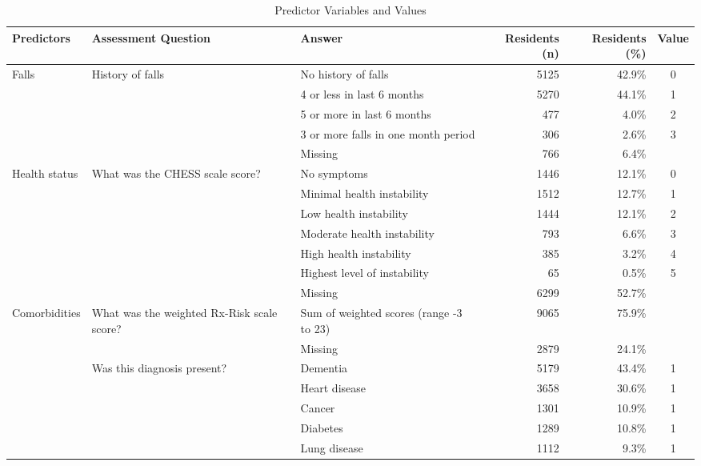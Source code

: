 \documentclass{article}
\begin{document}
\begin{table}[htbp]
\centering
\scriptsize
\caption{Predictor Variables and Values}
\label{tab:predictors}

\setlength{\extrarowheight}{-0.2pt} %
\setlength{\aboverulesep}{1pt} %
\setlength{\belowrulesep}{1pt} %

\begin{tabularx}{\textwidth}{@{}lXlrrc@{}}
\toprule
\textbf{Predictors} & \textbf{Assessment Question} & \textbf{Answer} & \textbf{Residents (n)} & \textbf{Residents (\%)} & \textbf{Value} \\
\midrule
\multirow{5}{*}{Falls} & \multirow{5}{=}{History of falls} & No history of falls & 5125 & 42.9\% & 0 \\
 & & 4 or less in last 6 months & 5270 & 44.1\% & 1 \\
 & & 5 or more in last 6 months & 477 & 4.0\% & 2 \\
 & & 3 or more falls in one month period & 306 & 2.6\% & 3 \\
 & & Missing & 766 & 6.4\% &  \\
\midrule
\multirow{7}{*}{Health status} & \multirow{7}{=}{What was the CHESS scale score?} & No symptoms & 1446 & 12.1\% & 0 \\
 & & Minimal health instability & 1512 & 12.7\% & 1 \\
 & & Low health instability & 1444 & 12.1\% & 2 \\
 & & Moderate health instability & 793 & 6.6\% & 3 \\
 & & High health instability & 385 & 3.2\% & 4 \\
 & & Highest level of instability & 65 & 0.5\% & 5 \\
 & & Missing & 6299 & 52.7\% &  \\
\midrule
\multirow{5}{*}{Comorbidities} & \multirow{2}{=}{What was the weighted Rx-Risk scale score?} & Sum of weighted scores (range -3 to 23) & 9065 & 75.9\% &  \\
 & & Missing & 2879 & 24.1\% &  \\
\cmidrule(l){2-6}
 & \multirow{5}{=}{Was this diagnosis present?} & Dementia & 5179 & 43.4\% & 1 \\
 & & Heart disease & 3658 & 30.6\% & 1 \\
 & & Cancer & 1301 & 10.9\% & 1 \\
 & & Diabetes & 1289 & 10.8\% & 1 \\
 & & Lung disease & 1112 & 9.3\% & 1 \\

\end{tabularx}
\end{table}
\end{document}
